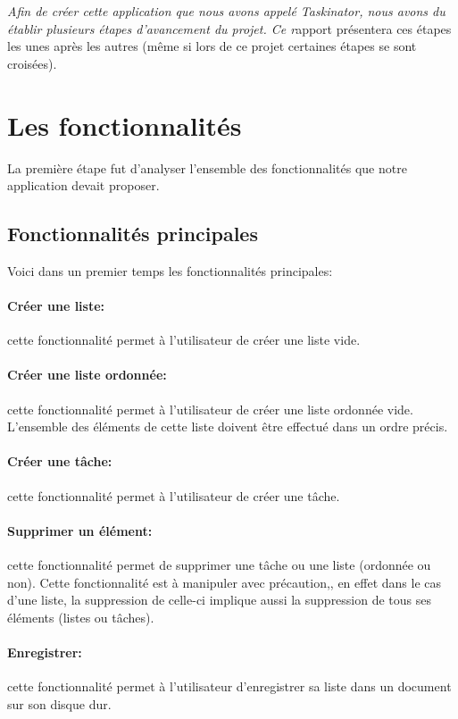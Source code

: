 \documentclass[a4paper,10pt]{article}
\begin{document}
\textit{Afin de créer cette application que nous avons appelé \textit{Taskinator}, nous avons du établir plusieurs étapes d'avancement du projet. Ce r}apport présentera ces étapes les unes après les autres (même si lors de ce projet certaines étapes se sont croisées).

\newpage
\section{Les fonctionnalités}
La première étape fut d'analyser l'ensemble des fonctionnalités que notre application devait proposer. 

\subsection{Fonctionnalités principales}
Voici dans un premier temps les fonctionnalités principales:
\paragraph{Créer une liste:} cette fonctionnalité permet à l'utilisateur de créer une liste vide.
\paragraph{Créer une liste ordonnée:} cette fonctionnalité permet à l'utilisateur de créer une liste ordonnée vide. L'ensemble des éléments de cette liste doivent être effectué dans un ordre précis.
\paragraph{Créer une tâche:} cette fonctionnalité permet à l'utilisateur de créer une tâche.
\paragraph{Supprimer un élément:} cette fonctionnalité permet de supprimer une tâche ou une liste (ordonnée ou non). Cette fonctionnalité est à manipuler avec précaution,, en effet dans le cas d'une liste, la suppression de celle-ci implique aussi la suppression de tous ses éléments (listes ou tâches).
\paragraph{Enregistrer:} cette fonctionnalité permet à l'utilisateur d'enregistrer sa liste dans un document sur son disque dur.
\end{document}
